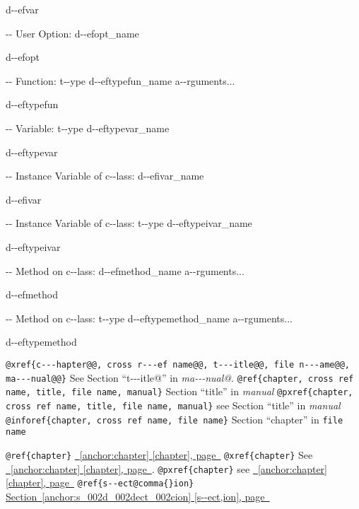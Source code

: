 \documentclass{book}
\begin{document}
%
d{-}{-}efvar

\hbox{}{-}{-} User Option: d{-}{-}efopt\_name


%
d{-}{-}efopt

\hbox{}{-}{-} Function: t{-}{-}ype d{-}{-}eftypefun\_name a{-}{-}rguments...


%
d{-}{-}eftypefun

\hbox{}{-}{-} Variable: t{-}{-}ype d{-}{-}eftypevar\_name


%
d{-}{-}eftypevar

\hbox{}{-}{-} Instance Variable of c{-}{-}lass: d{-}{-}efivar\_name


%
d{-}{-}efivar

\hbox{}{-}{-} Instance Variable of c{-}{-}lass: t{-}{-}ype d{-}{-}eftypeivar\_name


%
d{-}{-}eftypeivar

\hbox{}{-}{-} Method on c{-}{-}lass: d{-}{-}efmethod\_name a{-}{-}rguments...


%
d{-}{-}efmethod

\hbox{}{-}{-} Method on c{-}{-}lass: t{-}{-}ype d{-}{-}eftypemethod\_name a{-}{-}rguments...


%
d{-}{-}eftypemethod

\texttt{@xref\{c{-}{-}{-}hapter@@, cross r{-}{-}{-}ef name@@, t{-}{-}{-}itle@@, file n{-}{-}{-}ame@@, ma{-}{-}{-}nual@@\}} See Section ``t{-}{-}{-}itle@'' in \textit{ma{-}{-}{-}nual@}.
\texttt{@ref\{chapter, cross ref name, title, file name, manual\}} Section ``title'' in \textit{manual}
\texttt{@pxref\{chapter, cross ref name, title, file name, manual\}} see Section ``title'' in \textit{manual}
\texttt{@inforef\{chapter, cross ref name, file name\}} Section ``chapter'' in \texttt{file name}

\texttt{@ref\{chapter\}} \hyperref[anchor:chapter]{\chaptername~\ref*{anchor:chapter} [chapter], page~\pageref*{anchor:chapter}}
\texttt{@xref\{chapter\}} See \hyperref[anchor:chapter]{\chaptername~\ref*{anchor:chapter} [chapter], page~\pageref*{anchor:chapter}}.
\texttt{@pxref\{chapter\}} see \hyperref[anchor:chapter]{\chaptername~\ref*{anchor:chapter} [chapter], page~\pageref*{anchor:chapter}}
\texttt{@ref\{s{-}{-}ect@comma\{\}ion\}} \hyperref[anchor:s_002d_002dect_002cion]{Section~\ref*{anchor:s_002d_002dect_002cion} [s{-}{-}ect,ion], page~\pageref*{anchor:s_002d_002dect_002cion}}
\end{document}
